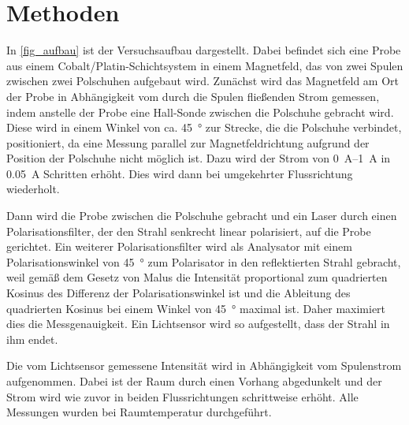 \documentclass[
	a4paper,
	12pt,
	pagesize,
	ngerman
]{scrartcl}
\begin{document}
	\section{Methoden}
	In \cref{fig_aufbau} ist der Versuchsaufbau dargestellt.
	Dabei befindet sich eine Probe aus einem Cobalt/Platin-Schichtsystem in einem Magnetfeld, das von zwei Spulen zwischen zwei Polschuhen aufgebaut wird.
	Zunächst wird das Magnetfeld am Ort der Probe in Abhängigkeit vom durch die Spulen fließenden Strom gemessen, indem anstelle der Probe eine Hall-Sonde zwischen die Polschuhe gebracht wird.
	Diese wird in einem Winkel von ca. \SI{45}{\degree} zur Strecke, die die Polschuhe verbindet, positioniert, da eine Messung parallel zur Magnetfeldrichtung aufgrund der Position der Polschuhe nicht möglich ist.
	Dazu wird der Strom von \SIrange{0}{1}{\ampere} in \SI{0,05}{\ampere} Schritten erhöht.
	Dies wird dann bei umgekehrter Flussrichtung wiederholt. %

	Dann wird die Probe zwischen die Polschuhe gebracht und ein Laser durch einen Polarisationsfilter, der den Strahl senkrecht linear polarisiert, auf die Probe gerichtet.
	Ein weiterer Polarisationsfilter wird als Analysator mit einem Polarisationswinkel von \SI{45}{\degree} zum Polarisator in den reflektierten Strahl gebracht, weil gemäß dem Gesetz von Malus die Intensität proportional zum quadrierten Kosinus des Differenz der Polarisationswinkel ist und die Ableitung des quadrierten Kosinus bei einem Winkel von \SI{45}{\degree} maximal ist. %
	Daher maximiert dies die Messgenauigkeit.
	Ein Lichtsensor wird so aufgestellt, dass der Strahl in ihm endet.%
	
	Die vom Lichtsensor gemessene Intensität wird in Abhängigkeit vom Spulenstrom aufgenommen.
	Dabei ist der Raum durch einen Vorhang abgedunkelt und der Strom wird wie zuvor in beiden Flussrichtungen schrittweise erhöht.
	Alle Messungen wurden bei Raumtemperatur durchgeführt.
	
\end{document}
